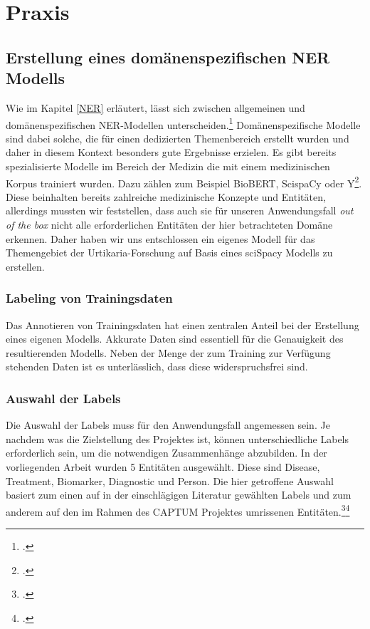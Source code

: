 \newpage
\section{Praxis} \label{latexDetails}
\subsection{Erstellung eines domänenspezifischen NER Modells}
Wie im Kapitel \ref{NER} erläutert, lässt sich zwischen allgemeinen und domänenspezifischen \ac{NER}-Modellen unterscheiden.\footcite[vgl.][S.47]{nouvel2016} Domänenspezifische Modelle sind dabei solche, die für einen dedizierten Themenbereich erstellt wurden und daher in diesem Kontext besonders gute Ergebnisse erzielen.
Es gibt bereits spezialisierte Modelle im Bereich der Medizin die mit einem medizinischen Korpus trainiert wurden. Dazu zählen zum Beispiel BioBERT, ScispaCy oder Y\footcite[S.12]{li2020}. Diese beinhalten bereits zahlreiche medizinische Konzepte und Entitäten, allerdings mussten wir feststellen, dass auch sie für unseren Anwendungsfall \textit{out of the box} nicht alle erforderlichen Entitäten der hier betrachteten Domäne erkennen. Daher haben wir uns entschlossen ein eigenes Modell für das Themengebiet der Urtikaria-Forschung auf Basis eines sciSpacy Modells zu erstellen.
\subsubsection{Labeling von Trainingsdaten}
Das Annotieren von Trainingsdaten hat einen zentralen Anteil bei der Erstellung eines eigenen Modells. Akkurate Daten sind essentiell für die Genauigkeit des resultierenden Modells. Neben der Menge der zum Training zur Verfügung stehenden Daten ist es unterlässlich, dass diese widerspruchsfrei sind.

\subsubsection{Auswahl der Labels}
Die Auswahl der Labels muss für den Anwendungsfall angemessen sein. Je nachdem was die Zielstellung des Projektes ist, können unterschiedliche Labels erforderlich sein, um die notwendigen Zusammenhänge abzubilden.
In der vorliegenden Arbeit wurden 5 Entitäten ausgewählt. Diese sind Disease, Treatment, Biomarker, Diagnostic und Person. Die hier getroffene Auswahl basiert zum einen auf in der einschlägigen Literatur gewählten Labels und zum anderem auf den im Rahmen des CAPTUM Projektes umrissenen Entitäten.\footcite[vgl.][S.]{li2016}\footcite[vgl.][S.]{eickhoff2020}

